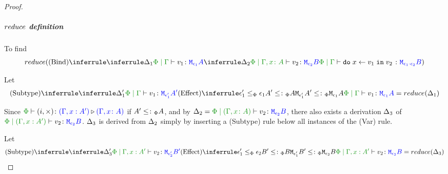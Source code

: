 \documentclass{report}
\begin{document}
\begin{framed}
\begin{proof}
        
                        \subparagraph{$reduce$ definition}
        
                        To find
                        \begin{equation}
                            \reduce(
                                \ntreeruleII{Bind}{
                                    \treeruleI{
                                        \D_1
                                    }{
                                        \gpetyperelation{v_1}{\M{\e_1}{A}}
                                    }
                                    }{
                                    \treeruleI{
                                        \D_2
                                    }{
                                        \etyperelation{\P}{\gax}{v_2}{\M{\e_2}{B}}
                                    }
                                } {
                                    \gpetyperelation{\doin{x}{v_1}{v_2}}{\M{\e_1\dot\e_2}{B}}
                                }
                            )
                        \end{equation}
        
        
                        Let \begin{equation}
                            \ntreeruleII{Subtype}{
                                \treeruleI{\D'_1}{\gpetyperelation{v_1}{\M{\e'_1}{A'}}}
                            }{
                            \subeffecttreep{\e_1'}{A'}{\e_1}{A}
                            }{
                                \gpetyperelation{v_1}{\M{\e_1}{A}}
                            } = \reduce(\D_1)
                        \end{equation}
        
                        Since $\ewrel{\P}{(i,\x)}{(\G, x: A')}{(\gax)}$ if $A' \leq\colon_\Phi A$, and by $\D_2 = \etyperelation{\P}{(\gax)}{v_2}{\M{\e_2}{B}}$, there also exists a derivation $\Delta_3$ of $\etyperelation{\P}{(\G, x: A')}{v_2}{\M{\e_2}{B}}$. $\Delta_3$ is derived from $\Delta_2$ simply by inserting a (Subtype) rule below all instances of the (Var) rule.
        
                        Let \begin{equation}
                            \ntreeruleII{Subtype}{
                                \treeruleI{\D'_3}{\etyperelation{\P}{\G, x: A'}{v_2}{\M{\e'_2}{B'}}}
                            }{
                            \subeffecttreep{\e_1'}{B'}{\e_2}{B}
                            }{
                                \etyperelation{\P}{\G, x: A'}{v_2}{\M{\e_2}{B}}
                            } = \reduce(\D_3)
                        \end{equation}
                        

\end{proof}
\end{framed}
\end{document}
